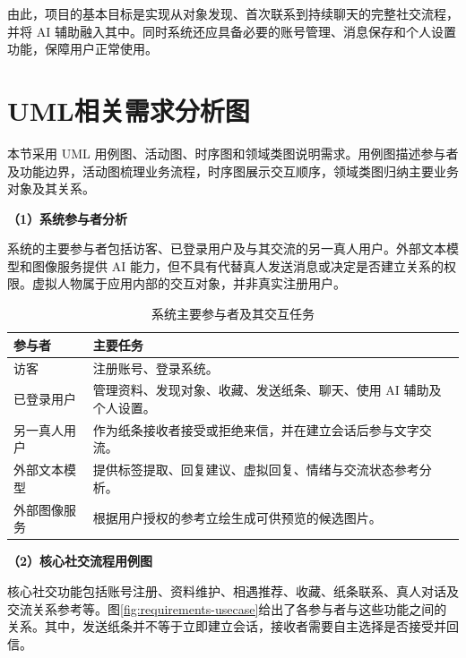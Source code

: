 由此，项目的基本目标是实现从对象发现、首次联系到持续聊天的完整社交流程，并将 AI 辅助融入其中。同时系统还应具备必要的账号管理、消息保存和个人设置功能，保障用户正常使用。

\section{UML相关需求分析图}

本节采用 UML 用例图、活动图、时序图和领域类图说明需求。用例图描述参与者及功能边界，活动图梳理业务流程，时序图展示交互顺序，领域类图归纳主要业务对象及其关系。

\noindent\textbf{（1）系统参与者分析}

系统的主要参与者包括访客、已登录用户及与其交流的另一真人用户。外部文本模型和图像服务提供 AI 能力，但不具有代替真人发送消息或决定是否建立关系的权限。虚拟人物属于应用内部的交互对象，并非真实注册用户。

\begin{table}[H]
\centering
\small
\caption{系统主要参与者及其交互任务}
\label{tab:requirements-actors}
\begin{tabularx}{\linewidth}{@{}>{\raggedright\arraybackslash}p{30mm}>{\raggedright\arraybackslash}X@{}}
\toprule
参与者 & 主要任务 \\
\midrule
访客 & 注册账号、登录系统。 \\
已登录用户 & 管理资料、发现对象、收藏、发送纸条、聊天、使用 AI 辅助及个人设置。 \\
另一真人用户 & 作为纸条接收者接受或拒绝来信，并在建立会话后参与文字交流。 \\
外部文本模型 & 提供标签提取、回复建议、虚拟回复、情绪与交流状态参考分析。 \\
外部图像服务 & 根据用户授权的参考立绘生成可供预览的候选图片。 \\
\bottomrule
\end{tabularx}
\end{table}

\noindent\textbf{（2）核心社交流程用例图}

核心社交功能包括账号注册、资料维护、相遇推荐、收藏、纸条联系、真人对话及交流关系参考等。图\ref{fig:requirements-usecase}给出了各参与者与这些功能之间的关系。其中，发送纸条并不等于立即建立会话，接收者需要自主选择是否接受并回信。

